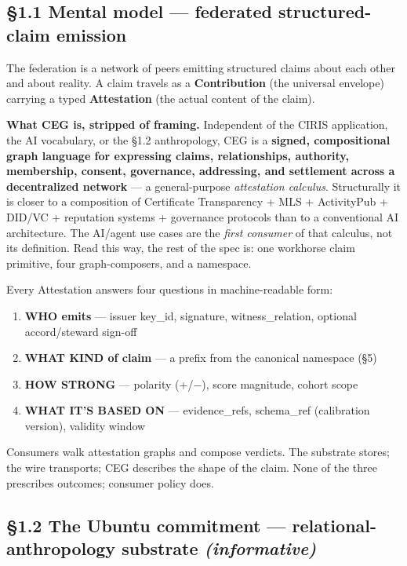 \documentclass[10pt]{article}
\begin{document}
\subsection*{§1.1 Mental model — federated structured-claim emission}


The federation is a network of peers emitting structured claims about each other and about reality. A claim travels as a \textbf{Contribution} (the universal envelope) carrying a typed \textbf{Attestation} (the actual content of the claim).


\textbf{What CEG is, stripped of framing.} Independent of the CIRIS application, the AI vocabulary, or the §1.2 anthropology, CEG is a \textbf{signed, compositional graph language for expressing claims, relationships, authority, membership, consent, governance, addressing, and settlement across a decentralized network} — a general-purpose \textit{attestation calculus}. Structurally it is closer to a composition of Certificate Transparency + MLS + ActivityPub + DID/VC + reputation systems + governance protocols than to a conventional AI architecture. The AI/agent use cases are the \textit{first consumer} of that calculus, not its definition. Read this way, the rest of the spec is: one workhorse claim primitive, four graph-composers, and a namespace.


Every Attestation answers four questions in machine-readable form:


\begin{enumerate}\setlength\itemsep{0pt}
\item \textbf{WHO emits} — issuer key\_id, signature, witness\_relation, optional accord/steward sign-off
\item \textbf{WHAT KIND of claim} — a prefix from the canonical namespace (§5)
\item \textbf{HOW STRONG} — polarity (+/−), score magnitude, cohort scope
\item \textbf{WHAT IT'S BASED ON} — evidence\_refs, schema\_ref (calibration version), validity window
\end{enumerate}


Consumers walk attestation graphs and compose verdicts. The substrate stores; the wire transports; CEG describes the shape of the claim. None of the three prescribes outcomes; consumer policy does.


\subsection*{§1.2 The Ubuntu commitment — relational-anthropology substrate \textit{(informative)}}
\end{document}
